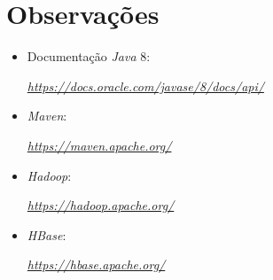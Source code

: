 \documentclass[a4paper]{report}
\begin{document}
\appendix
\chapter{Observações} \label{ch:Observations}
\begin{itemize}
    \item Documentação \textit{Java} 8:
    \par \textit{\url{https://docs.oracle.com/javase/8/docs/api/}}
	\item \textit{Maven}:
    \par \textit{\url{https://maven.apache.org/}}
    \item \textit{Hadoop}:
    \par \textit{\url{https://hadoop.apache.org/}}
    \item \textit{HBase}:
    \par \textit{\url{https://hbase.apache.org/}}
\end{itemize}
\end{document}
